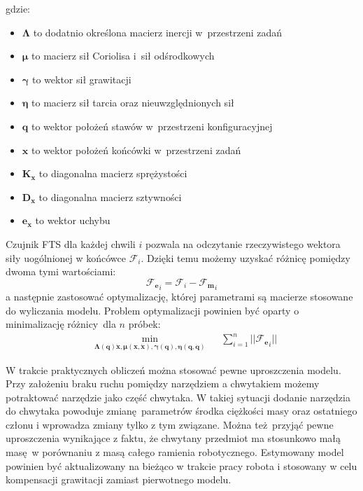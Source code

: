 gdzie: 

\begin{itemize}
	\item $\boldsymbol{\Lambda}$ to dodatnio określona macierz inercji w~przestrzeni zadań
	\item $\boldsymbol{\mu}$ to macierz sił Coriolisa i~sił odśrodkowych	
	\item $\boldsymbol{\gamma}$ to wektor sił grawitacji
	\item $\boldsymbol{\eta}$ to macierz sił tarcia oraz nieuwzględnionych sił
	\item $\boldsymbol{q}$ to wektor położeń stawów w~przestrzeni konfiguracyjnej
	\item $\boldsymbol{x}$ to wektor położeń końcówki w~przestrzeni zadań
	\item $\boldsymbol{K_x}$ to diagonalna macierz sprężystości
	\item $\boldsymbol{D_x}$ to diagonalna macierz sztywności
	\item $\boldsymbol{e_x}$ to wektor uchybu
\end{itemize} 


Czujnik FTS dla każdej chwili $i$ pozwala na odczytanie rzeczywistego wektora siły uogólnionej w końcówce $\boldsymbol{\mathcal{F}}_i$. Dzięki temu możemy uzyskać różnicę pomiędzy dwoma tymi wartościami:
\begin{equation}
\boldsymbol{\mathcal{F}_{e}}_i = \boldsymbol{\mathcal{F}}_{i} - \boldsymbol{\mathcal{F}_{m}}_i
\end{equation}
a następnie zastosować optymalizację, której parametrami są macierze stosowane do wyliczania modelu. Problem optymalizacji powinien być oparty o minimalizację różnicy dla $n$ próbek:
\begin{equation}
\begin{aligned}
& \underset{\boldsymbol{\Lambda}(\boldsymbol{q})\boldsymbol{\ddot{x}}, \boldsymbol{\mu}(\boldsymbol{x}, \boldsymbol{\dot{x}}), \boldsymbol{\gamma}(\boldsymbol{q}), \boldsymbol{\eta}(\boldsymbol{q}, \boldsymbol{\dot{q}})}{\text{min}}
& & \sum_{i = 1}^{n} || \boldsymbol{\mathcal{F}_{e}}_i ||
\end{aligned}
\end{equation}

W trakcie praktycznych obliczeń można stosować pewne uproszczenia modelu. Przy założeniu braku ruchu pomiędzy narzędziem a chwytakiem możemy potraktować narzędzie jako część chwytaka. W takiej sytuacji dodanie narzędzia do chwytaka powoduje zmianę parametrów środka ciężkości masy oraz ostatniego członu i wprowadza zmiany tylko z tym związane. Można też przyjąć pewne uproszczenia wynikające z faktu, że chwytany przedmiot ma stosunkowo małą masę w porównaniu z masą całego ramienia robotycznego. Estymowany model powinien być aktualizowany na bieżąco w trakcie pracy robota i stosowany w celu kompensacji grawitacji zamiast pierwotnego modelu.

